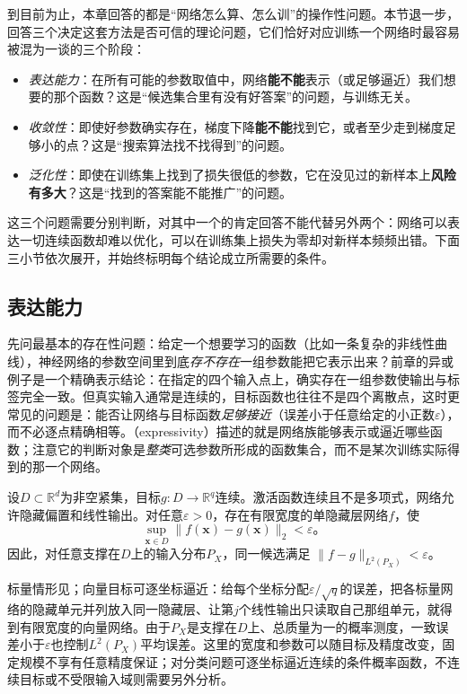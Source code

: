 到目前为止，本章回答的都是“网络怎么算、怎么训”的操作性问题。本节退一步，回答三个决定这套方法是否可信的理论问题，它们恰好对应训练一个网络时最容易被混为一谈的三个阶段：
\begin{itemize}
  \item \emph{表达能力}：在所有可能的参数取值中，网络\textbf{能不能}表示（或足够逼近）我们想要的那个函数？这是“候选集合里有没有好答案”的问题，与训练无关。
  \item \emph{收敛性}：即使好参数确实存在，梯度下降\textbf{能不能}找到它，或者至少走到梯度足够小的点？这是“搜索算法找不找得到”的问题。
  \item \emph{泛化性}：即使在训练集上找到了损失很低的参数，它在没见过的新样本上\textbf{风险有多大}？这是“找到的答案能不能推广”的问题。
\end{itemize}
这三个问题需要分别判断，对其中一个的肯定回答不能代替另外两个：网络可以表达一切连续函数却难以优化，可以在训练集上损失为零却对新样本频频出错。下面三小节依次展开，并始终标明每个结论成立所需要的条件。

\subsection{表达能力}
\label{sec:ffn-expressivity}

先问最基本的存在性问题：给定一个想要学习的函数（比如一条复杂的非线性曲线），神经网络的参数空间里到底\emph{存不存在}一组参数能把它表示出来？前章的异或例子是一个精确表示结论：在指定的四个输入点上，确实存在一组参数使输出与标签完全一致。但真实输入通常是连续的，目标函数也往往不是四个离散点，这时更常见的问题是：能否让网络与目标函数\emph{足够接近}（误差小于任意给定的小正数$\varepsilon$），而不必逐点精确相等。（expressivity）描述的就是网络族能够表示或逼近哪些函数；注意它的判断对象是\emph{整类}可选参数所形成的函数集合，而不是某次训练实际得到的那一个网络。

\begin{theorem}[前馈网络对紧集上连续目标的逼近能力]
\label{thm:ffn-continuous-approximation}
设$D\subset\mathbb R^d$为非空紧集，目标$g:D\to\mathbb R^q$连续。激活函数连续且不是多项式，网络允许隐藏偏置和线性输出。对任意$\varepsilon>0$，存在有限宽度的单隐藏层网络$f$，使
\[
 \sup_{\bm x\in D}\lVert f(\bm x)-g(\bm x)\rVert_2<\varepsilon\text{。}
\]
因此，对任意支撑在$D$上的输入分布$P_X$，同一候选满足
$\lVert f-g\rVert_{L^2(P_X)}<\varepsilon$。
\end{theorem}
标量情形见；向量目标可逐坐标逼近：给每个坐标分配$\varepsilon/\sqrt q$的误差，把各标量网络的隐藏单元并列放入同一隐藏层、让第$j$个线性输出只读取自己那组单元，就得到有限宽度的向量网络。由于$P_X$是支撑在$D$上、总质量为一的概率测度，一致误差小于$\varepsilon$也控制$L^2(P_X)$平均误差。这里的宽度和参数可以随目标及精度改变，固定规模不享有任意精度保证；对分类问题可逐坐标逼近连续的条件概率函数，不连续目标或不受限输入域则需要另外分析。

